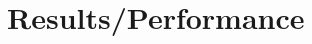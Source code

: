 \documentclass[letterpaper, preprint, paper,11pt]{AAS}
\begin{document}
%
%
%
%
%
%
\section{Results/Performance}



\end{document}

